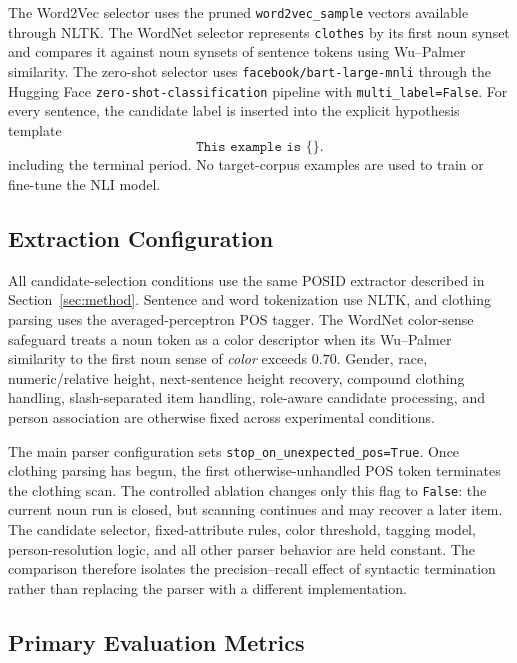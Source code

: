 \documentclass[sigconf,nonacm]{acmart}
\newcommand{\posid}{\textsc{POSID}}
\begin{document}
The Word2Vec selector uses the pruned \texttt{word2vec\_sample} vectors
available through NLTK.  The WordNet selector represents \texttt{clothes} by
its first noun synset and compares it against noun synsets of sentence tokens
using Wu--Palmer similarity.  The zero-shot selector uses
\texttt{facebook/bart-large-mnli} through the Hugging Face
\texttt{zero-shot-classification} pipeline with \texttt{multi\_label=False}.
For every sentence, the candidate label is inserted into the explicit
hypothesis template
\begin{equation}
\texttt{This example is \{\}.}
\label{eq:experiment-nli-template}
\end{equation}
including the terminal period.  No target-corpus examples are used to train or
fine-tune the NLI model.

\subsection{Extraction Configuration}
\label{subsec:experimental-extraction}

All candidate-selection conditions use the same \posid{} extractor described
in Section~\ref{sec:method}.  Sentence and word tokenization use NLTK, and
clothing parsing uses the averaged-perceptron POS tagger.  The WordNet
color-sense safeguard treats a noun token as a color descriptor when its
Wu--Palmer similarity to the first noun sense of \emph{color} exceeds $0.70$.
Gender, race, numeric/relative height, next-sentence height recovery, compound
clothing handling, slash-separated item handling, role-aware candidate
processing, and person association are otherwise fixed across experimental
conditions.

The main parser configuration sets
\texttt{stop\_on\_unexpected\_pos=True}.  Once clothing parsing has begun, the
first otherwise-unhandled POS token terminates the clothing scan.  The
controlled ablation changes only this flag to \texttt{False}: the current noun
run is closed, but scanning continues and may recover a later item.  The
candidate selector, fixed-attribute rules, color threshold, tagging model,
person-resolution logic, and all other parser behavior are held constant.  The
comparison therefore isolates the precision--recall effect of syntactic
termination rather than replacing the parser with a different implementation.

\subsection{Primary Evaluation Metrics}
\label{subsec:experimental-metrics}
\end{document}
